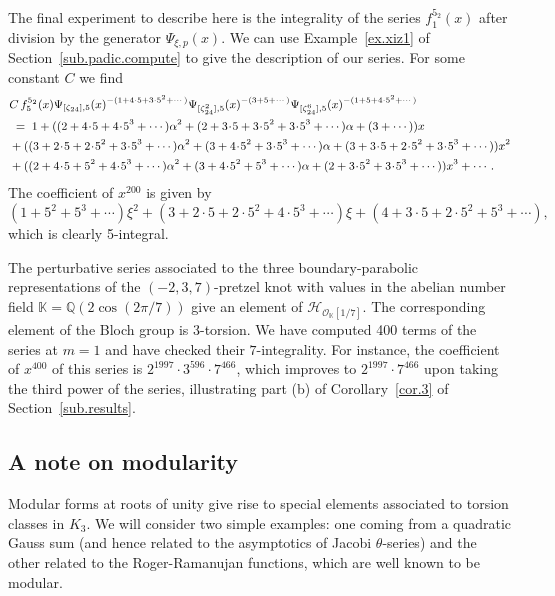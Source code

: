 \documentclass[12pt,reqno]{amsart}
\theoremstyle{definition}
\def\BQ{\mathbb Q}
\def\BK{\mathbb K}
\def\calH{\mathcal H}
\def\a{\alpha}
\def\th{\theta}
\def\be{\begin{equation}}
\def\ee{\end{equation}}
\def\z{\zeta}
\def\calO{\mathcal{O}}
\def\={\;=\;}
\def\Phitof{f}
\begin{document}
The final experiment to describe here is the integrality of the series
$\Phitof^{5_2}_1(x)$ after division by the generator $\Psi_{\xi,p}(x)$.
We can use Example~\ref{ex.xiz1} of Section~\ref{sub.padic.compute} to give the
description of our series. For some constant $C$ we find
\be
\begin{small}
\begin{aligned}
&C\,\Phitof^{5_2}_5(x)
\Psi_{[\z_{24}],5}(x)^{-(1 + 4\cdot 5 + 3\cdot 5^2 + \cdots)}
\Psi_{[\z_{24}^2],5}(x)^{-(3 + 5 + \cdots)}
\Psi_{[\z_{24}^6],5}(x)^{-(1 + 5 + 4\cdot 5^2 + \cdots)}\\
&\=1 + ((2 + 4\!\cdot\!5 + 4\!\cdot\!5^3 + \cdots)\a^2 + (2 + 3\!\cdot\!5
+ 3\!\cdot\!5^2
+ 3\!\cdot\!5^3 + \cdots)\a + (3 + \cdots))x\\
&+ ((3 + 2\!\cdot\!5 + 2\!\cdot\!5^2 + 3\!\cdot\!5^3 + \cdots)\a^2 + (3 + 4\!\cdot\!5^2
+ 3\!\cdot\!5^3 + \cdots)\a + (3 + 3\!\cdot\!5 + 2\!\cdot\!5^2 + 3\!\cdot\!5^3
+ \cdots))x^2\\
&+ ((2 + 4\!\cdot\!5 + 5^2 + 4\!\cdot\!5^3 + \cdots)\a^2 + (3 + 4\!\cdot\!5^2
+ 5^3 + \cdots)\a + (2 + 3\!\cdot\!5^2 + 3\!\cdot\!5^3 + \cdots))x^3
+\cdots\,.
\end{aligned}
\end{small}
\ee
The coefficient of $x^{200}$ is given by
\be
(1 + 5^2 + 5^3 + \cdots)\xi^2 + (3 + 2\cdot5 + 2\cdot5^2 + 4\cdot5^3 + \cdots)\xi
+ (4 + 3\cdot5 + 2\cdot5^2 + 5^3 + \cdots),
\ee
which is clearly 5-integral.

\medskip

The perturbative series associated to the three boundary-parabolic representations
of the $(-2,3,7)$-pretzel knot with values in the abelian number field
$\BK=\BQ(2\cos(2\pi/7))$ give an element of $\calH_{\calO_\BK[1/7]}$. The corresponding
element of the Bloch group is 3-torsion. We have computed 400 terms of the series
at $m=1$ and have checked their $7$-integrality. For instance, the coefficient of
$x^{400}$
of this series is $2^{1997} \cdot 3^{596} \cdot 7^{466}$, which improves to
$2^{1997} \cdot 7^{466}$ upon taking the third power of the series, illustrating
part (b) of Corollary~\ref{cor.3} of Section~\ref{sub.results}.


\subsection{A note on modularity}
\label{sub.mod}

Modular forms at roots of unity give rise to special elements associated to torsion
classes in $K_3$. We will consider two simple examples: one coming from a quadratic
Gauss sum (and hence related to the asymptotics of Jacobi $\th$-series) and the other
related to the Roger-Ramanujan functions, which are well known to be modular.
\end{document}

